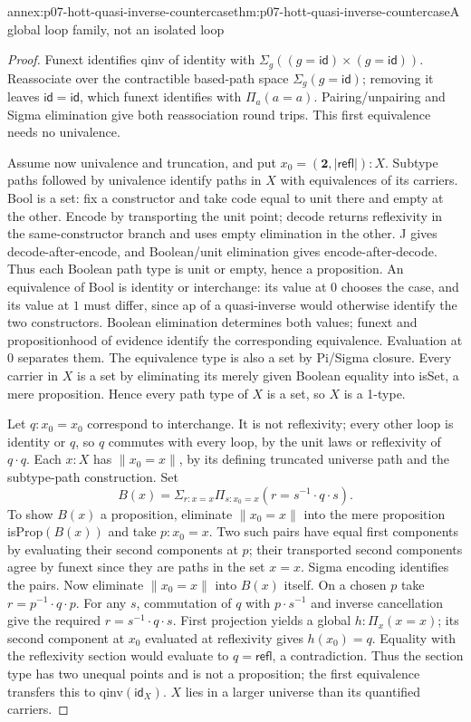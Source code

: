 \begin{annexitem}{annex:p07-hott-quasi-inverse-countercase}{thm:p07-hott-quasi-inverse-countercase}{A global loop family, not an isolated loop}
\begin{proof}
Funext identifies qinv of identity with
$\Sigma_g((g=\mathsf{id})\times(g=\mathsf{id}))$.
Reassociate over the contractible based-path space $\Sigma_g(g=\mathsf{id})$;
removing it leaves $\mathsf{id}=\mathsf{id}$, which funext identifies
with $\Pi_a(a=a)$. Pairing/unpairing and Sigma elimination give both
reassociation round trips. This first equivalence needs no univalence.

Assume now univalence and truncation, and put
$x_0=(\mathbf2,|\mathsf{refl}|):X$. Subtype paths followed by
univalence identify paths in $X$ with equivalences of its carriers.
Bool is a set: fix a constructor and take code equal to unit there
and empty at the other. Encode by transporting the unit point;
decode returns reflexivity in the same-constructor branch and uses
empty elimination in the other. J gives decode-after-encode, and
Boolean/unit elimination gives encode-after-decode. Thus each
Boolean path type is unit or empty, hence a proposition.
An equivalence of Bool is identity or interchange: its value at
$0$ chooses the case, and its value at $1$ must differ, since ap of
a quasi-inverse would otherwise identify the two constructors.
Boolean elimination determines both values; funext and propositionhood
of evidence identify the corresponding equivalence. Evaluation at
$0$ separates them. The equivalence type is also a set by Pi/Sigma
closure. Every carrier in $X$ is a set by eliminating its merely
given Boolean equality into isSet, a mere proposition. Hence every
path type of $X$ is a set, so $X$ is a 1-type.

Let $q:x_0=x_0$ correspond to interchange. It is not reflexivity;
every other loop is identity or $q$, so $q$ commutes with every loop,
by the unit laws or reflexivity of $q\cdot q$. Each $x:X$ has
$\|x_0=x\|$, by its defining truncated universe path and the
subtype-path construction. Set
\[
 B(x)=\Sigma_{r:x=x}\Pi_{s:x_0=x}(r=s^{-1}\cdot q\cdot s).
\]
To show $B(x)$ a proposition, eliminate $\|x_0=x\|$ into the
mere proposition isProp$(B(x))$ and take $p:x_0=x$. Two such pairs
have equal first components by evaluating their second components
at $p$; their transported second components agree by funext since
they are paths in the set $x=x$. Sigma encoding identifies the pairs.
Now eliminate $\|x_0=x\|$ into $B(x)$ itself. On a chosen $p$
take $r=p^{-1}\cdot q\cdot p$. For any $s$, commutation of $q$
with $p\cdot s^{-1}$ and inverse cancellation give the required
$r=s^{-1}\cdot q\cdot s$. First projection yields a global
$h:\Pi_x(x=x)$; its second component at $x_0$ evaluated at
reflexivity gives $h(x_0)=q$. Equality with the reflexivity section
would evaluate to $q=\mathsf{refl}$, a contradiction. Thus the
section type has two unequal points and is not a proposition;
the first equivalence transfers this to qinv$(\mathsf{id}_X)$.
$X$ lies in a larger universe than its quantified carriers.
\end{proof}
\end{annexitem}
